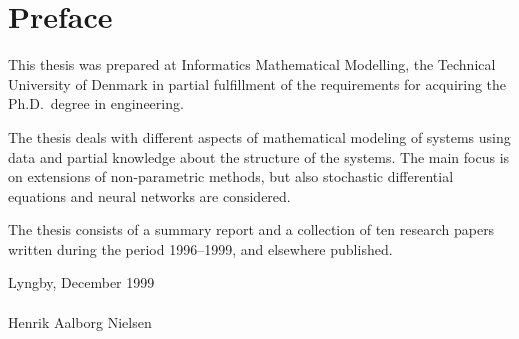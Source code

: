 \chapter*{Preface}

This thesis was prepared at Informatics Mathematical Modelling,
the Technical University of Denmark in partial fulfillment of the
requirements for acquiring the Ph.D.\ degree in engineering.

The thesis deals with different aspects of mathematical modeling of
systems using data and partial knowledge about the structure of the
systems.  The main focus is on extensions of non-parametric methods,
but also stochastic differential equations and neural networks are
considered.

The thesis consists of a summary report and a collection of ten
research papers written during the period 1996--1999, and elsewhere
published.

\vspace{20mm}
\mbox{}\hfill
\begin{minipage}[t]{80mm}
  Lyngby, December 1999
  \\ \\
  Henrik Aalborg Nielsen
\end{minipage}
